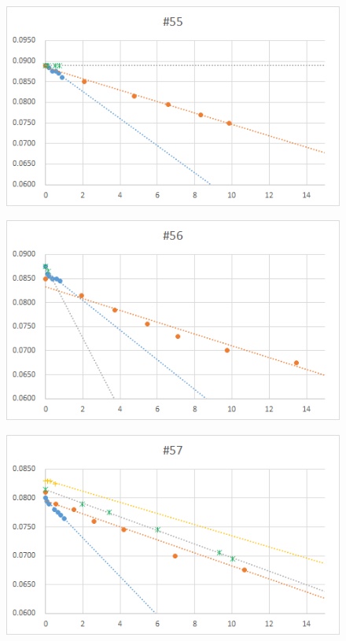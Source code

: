   \begin{figure}[htbp]
    \centering
       \includegraphics[width=120mm]{vol_055.png}
  \end{figure}
  \begin{figure}[htbp]
    \centering
       \includegraphics[width=120mm]{vol_056.png}
  \end{figure}
  \begin{figure}[htbp]
    \centering
       \includegraphics[width=120mm]{vol_057.png}
  \end{figure}
